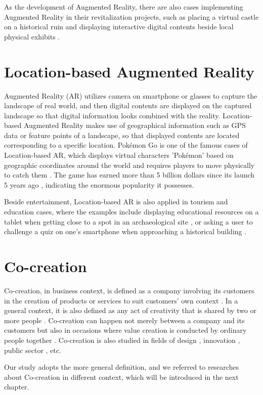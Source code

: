 As the development of Augmented Reality, there are also cases implementing Augmented Reality in their revitalization projects,
such as placing a virtual castle on a historical ruin \cite{井上道哉_長澤可也_2021} and displaying interactive digital contents beside local physical exhibits \cite{センチメンタル価値再生_2016}\cite{armarker_and_behavior_log_2011}.

\section{Location-based Augmented Reality}
Augmented Reality (AR) \cite{van_krevelen_poelman_2010} utilizes camera on smartphone or glasses to capture the landscape of real world,
and then digital contents are displayed on the captured landscape so that digital information looks combined with the reality.
Location-based Augmented Reality makes use of geographical information such as GPS data or feature points of a landscape,
so that displayed contents are located corresponding to a specific location.
Pokémon Go is one of the famous cases of Location-based AR, which displays virtual characters 'Pokémon' based on geographic coordinates around the world and requires players to move physically to catch them \cite{pokemongo_homepage}.
The game has earned more than 5 billion dollars since its launch 5 years ago \cite{strategist_2021}, indicating the enormous popularity it possesses.

Beside entertainment, Location-based AR is also applied in tourism and education cases, where the
examples include displaying educational resources on a tablet when getting close to a spot in an archaeological site \cite{law_2018},
or asking a user to challenge a quiz on one's smartphone when approaching a historical building \cite{hwang_chang_chen_chen_2017}.

\section{Co-creation}
Co-creation, in business context, is defined as a company involving its customers in the creation of products or services to suit customers' own context \cite{cocreation_definition}.
In a general context, it is also defined as any act of creativity that is shared by two or more people \cite{cocreation_definition_general}.
Co-creation can happen not merely between a company and its customers but also in occasions where value creation is conducted by ordinary people together \cite{cocreation_general_case}.
Co-creation is also studied in fields of design \cite{cocreation_definition_general}, innovation \cite{lee_olson_trimi_2012}, public sector \cite{osborne_radnor_strokosch_2016}, etc.

Our study adopts the more general definition, and we referred to researches about Co-creation in different context, which will be introduced in the next chapter.